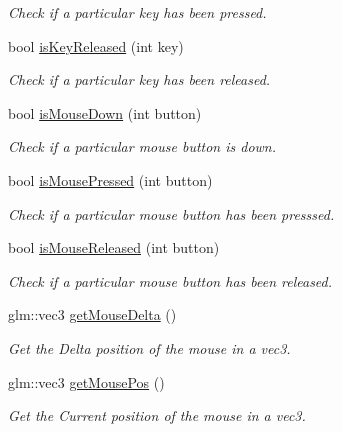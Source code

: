 \begin{DoxyCompactItemize}
\begin{DoxyCompactList}\small\item\em Check if a particular key has been pressed. \end{DoxyCompactList}\item 
bool \mbox{\hyperlink{class_input_system_aa5958921b6cd8d711a3c49b358ec8e90}{is\+Key\+Released}} (int key)
\begin{DoxyCompactList}\small\item\em Check if a particular key has been released. \end{DoxyCompactList}\item 
bool \mbox{\hyperlink{class_input_system_ae7d3e90aaf6ba8a070f660f25997a2bb}{is\+Mouse\+Down}} (int button)
\begin{DoxyCompactList}\small\item\em Check if a particular mouse button is down. \end{DoxyCompactList}\item 
bool \mbox{\hyperlink{class_input_system_a0d8c4979a46e2858d3f351cfcf755757}{is\+Mouse\+Pressed}} (int button)
\begin{DoxyCompactList}\small\item\em Check if a particular mouse button has been presssed. \end{DoxyCompactList}\item 
bool \mbox{\hyperlink{class_input_system_ae32725811a1db2b5a72974773b8d1ef8}{is\+Mouse\+Released}} (int button)
\begin{DoxyCompactList}\small\item\em Check if a particular mouse button has been released. \end{DoxyCompactList}\item 
\mbox{\label{class_input_system_a7bf6931374d71d95f551582574adcd92}} 
glm\+::vec3 \mbox{\hyperlink{class_input_system_a7bf6931374d71d95f551582574adcd92}{get\+Mouse\+Delta}} ()
\begin{DoxyCompactList}\small\item\em Get the Delta position of the mouse in a vec3. \end{DoxyCompactList}\item 
\mbox{\label{class_input_system_aab61f34247a3c1bf0070752d83fc8fd1}} 
glm\+::vec3 \mbox{\hyperlink{class_input_system_aab61f34247a3c1bf0070752d83fc8fd1}{get\+Mouse\+Pos}} ()
\begin{DoxyCompactList}\small\item\em Get the Current position of the mouse in a vec3. \end{DoxyCompactList}\end{DoxyCompactItemize}
